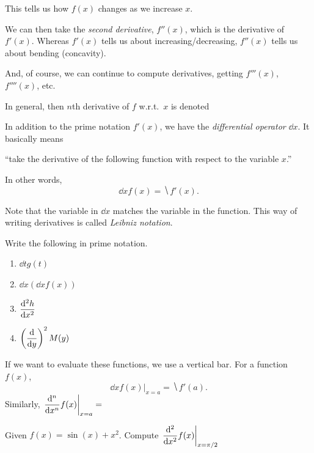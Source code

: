 This tells us how $f(x)$ changes as we increase $x$.  

We can then take the \emph{second derivative}, $f''(x)$, which is the derivative of $f'(x)$. Whereas $f'(x)$ tells us about increasing/decreasing, $f''(x)$ tells us about bending (concavity).

And, of course, we can continue to compute derivatives, getting $f'''(x)$, $f''''(x)$, etc.
\vspace{.3in}

In general, then $n$th derivative of $f$ w.r.t.\ $x$ is denoted 
\bigskip 

In addition to the prime notation $f'(x)$, we have the \emph{differential operator} $\displaystyle\dd{x}$. It basically means \begin{center}``take the derivative of the following function with respect to the variable $x$.''\end{center}  In other words, 
\[
    \dd{x}f(x) = \hide{f'(x).}
\] 
\medskip 

\noindent Note that the variable in $\dd{x}$ matches the variable in the function. This way of writing derivatives is called \emph{Leibniz notation}.
\begin{ex}
    Write the following in prime notation.
    \begin{multicols}{2}
    \begin{enumerate}
        \item $\displaystyle\dd{t} g(t)$
        \item $\displaystyle\dd{x}\left(\dd{x}f(x)\right)$
        \item $\displaystyle\frac{\mathop{}\!\mathrm{d}^2 h}{\mathop{}\!\mathrm{d} x^2}$
        \item $\displaystyle\left(\frac{\mathop{}\!\mathrm{d}}{\mathop{}\!\mathrm{d} y}\right)^2M(y)$
    \end{enumerate}
    \end{multicols}
\end{ex}
If we want to evaluate these functions, we use a vertical bar.
For a function $f(x)$, 
\[
    \left.\dd{x}f(x)\right|_{x=a}=\hide{f'(a).}
\]
Similarly, $\left.\dfrac{\dif^n}{\dif x^n}f(x)\right|_{x=a}=\phantom{f^{(n)}(a)}$
\begin{ex}
    Given $f(x)=\sin(x)+x^2$. Compute $\left.\dfrac{\mathop{}\!\mathrm{d}^2}{\mathop{}\!\mathrm{d} x^2}f(x)\right|_{x=\pi/2}$
\end{ex}


